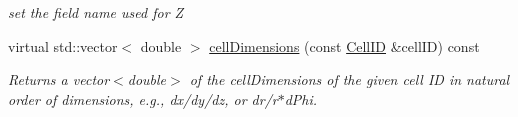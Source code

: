 \begin{DoxyCompactItemize}
\begin{DoxyCompactList}\small\item\em set the field name used for Z \item\end{DoxyCompactList}\item 
virtual std::vector$<$ double $>$ \hyperlink{class_d_d4hep_1_1_d_d_segmentation_1_1_cartesian_grid_y_z_a8422ef9feccf16729b9c3b2e63a284a7}{cellDimensions} (const \hyperlink{namespace_d_d4hep_1_1_d_d_segmentation_ac7af071d85cb48820914434a07e21ba1}{CellID} \&cellID) const 
\begin{DoxyCompactList}\small\item\em Returns a vector$<$double$>$ of the cellDimensions of the given cell ID in natural order of dimensions, e.g., dx/dy/dz, or dr/r$\ast$dPhi. \item\end{DoxyCompactList}\end{DoxyCompactItemize}
